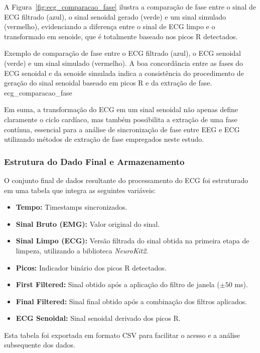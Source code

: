 A Figura~\ref{fig:ecg_comparacao_fase} ilustra a comparação de fase entre o sinal de ECG filtrado (azul), o sinal senoidal gerado (verde) e um sinal simulado (vermelho), evidenciando a diferença entre o sinal de ECG limpo e o transformado em senoide, que é totalmente baseado nos picos R detectados.

{Exemplo de comparação de fase entre o ECG filtrado (azul), o ECG senoidal (verde) e um sinal simulado (vermelho). A boa concordância entre as fases do ECG senoidal e da senoide simulada indica a consistência do procedimento de geração do sinal senoidal baseado em picos R e da extração de fase.}
{ecg_comparacao_fase}

Em suma, a transformação do ECG em um sinal senoidal não apenas define claramente o ciclo cardíaco, mas também possibilita a extração de uma fase contínua, essencial para a análise de sincronização de fase entre EEG e ECG utilizando métodos de extração de fase empregados neste estudo.

\subsubsection{Estrutura do Dado Final e Armazenamento}
O conjunto final de dados resultante do processamento do ECG foi estruturado em uma tabela que integra as seguintes variáveis:
\begin{itemize}
    \item \textbf{Tempo:} Timestamps sincronizados.
    \item \textbf{Sinal Bruto (EMG):} Valor original do sinal.
    \item \textbf{Sinal Limpo (ECG):} Versão filtrada do sinal obtida na primeira etapa de limpeza, utilizando a biblioteca \textit{NeuroKit2}.
    \item \textbf{Picos:} Indicador binário dos picos R detectados.
    \item \textbf{First Filtered:} Sinal obtido após a aplicação do filtro de janela (\(\pm50\) ms).
    \item \textbf{Final Filtered:} Sinal final obtido após a combinação dos filtros aplicados.
    \item \textbf{ECG Senoidal:} Sinal senoidal derivado dos picos R.
\end{itemize}

Esta tabela foi exportada em formato CSV para facilitar o acesso e a análise subsequente dos dados.
